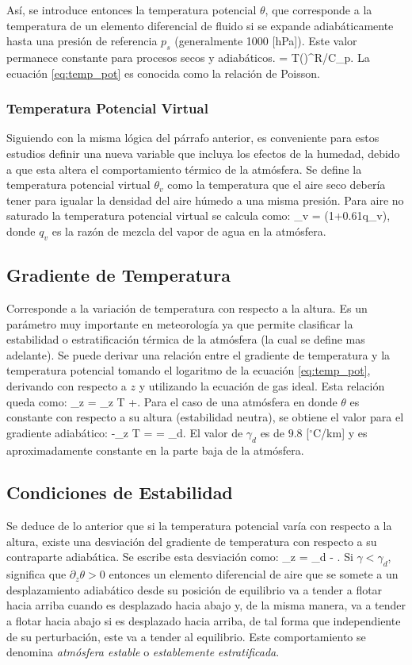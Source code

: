 Así, se introduce entonces la temperatura potencial $\theta$, que corresponde a la temperatura de un elemento diferencial de fluido si se expande adiabáticamente hasta una presión de referencia $p_s$ (generalmente 1000 [hPa]). Este valor permanece constante para procesos secos y adiabáticos.
\be \label{eq:temp_pot}
\theta = T\left(\right)^{R/C_p}.
\ee 
La ecuación \ref{eq:temp_pot} es conocida como la relación de Poisson.
\subsubsection{Temperatura Potencial Virtual}
Siguiendo con la misma lógica del párrafo anterior, es conveniente para estos estudios definir una nueva variable que incluya los efectos de la humedad, debido a que esta altera el comportamiento térmico de la atmósfera. Se define la temperatura potencial virtual $\theta_v$ como la temperatura que el aire seco debería tener para igualar la densidad del aire húmedo a una misma presión. Para aire no saturado la temperatura potencial virtual se calcula como:
\be 
\theta_v = \theta(1+0.61q_v),
\ee
donde $q_v$ es la razón de mezcla del vapor de agua en la atmósfera.
\subsection{Gradiente de Temperatura}
Corresponde a la variación de temperatura con respecto a la altura. Es un parámetro muy importante en meteorología ya que permite clasificar la estabilidad o estratificación térmica de la atmósfera (la cual se define mas adelante). Se puede derivar una relación entre el gradiente de temperatura y la temperatura potencial tomando el logaritmo de la ecuación \ref{eq:temp_pot}, derivando con respecto a $z$ y utilizando la ecuación de gas ideal. Esta relación queda como:
\be 
{}\partial_z \theta = \partial_z T +.
\ee
Para el caso de una atmósfera en donde $\theta$ es constante con respecto a su altura (estabilidad neutra), se obtiene el valor para el gradiente adiabático:
\be 
-\partial_z T = = \gamma_d.
\ee
El valor de $\gamma_d$ es de $9.8$ [$^\circ$C/km] y es aproximadamente constante en la parte baja de la atmósfera.
\subsection{Condiciones de Estabilidad}
Se deduce de lo anterior que si la temperatura potencial varía con respecto a la altura, existe una desviación del gradiente de temperatura con respecto a su contraparte adiabática. Se escribe esta desviación como:
\be 
{}\partial_z \theta = \gamma_d - \gamma.
\ee
Si $\gamma<\gamma_d$, significa que $\partial_z \theta>0$ entonces un elemento diferencial de aire que se somete a un desplazamiento adiabático desde su posición de equilibrio va a tender a flotar hacia arriba cuando es desplazado hacia abajo y, de la misma manera, va a tender a flotar hacia abajo si es desplazado hacia arriba, de tal forma que independiente de su perturbación, este va a tender al equilibrio. Este comportamiento se denomina \emph{atmósfera estable} o \emph{establemente estratificada}.

